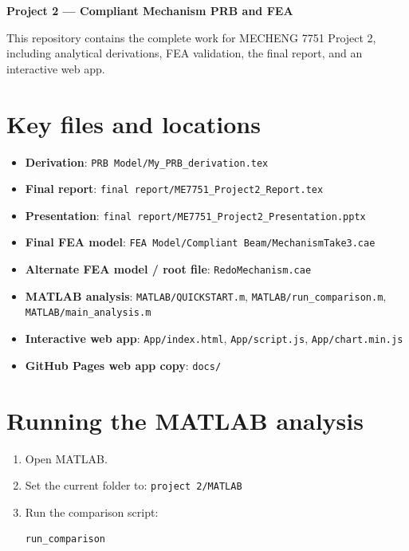 \documentclass[11pt]{article}
\begin{document}
\begin{center}
{\LARGE\bfseries Project 2 — Compliant Mechanism PRB and FEA}\\[1em]
\end{center}

This repository contains the complete work for MECHENG 7751 Project 2, including analytical derivations, FEA validation, the final report, and an interactive web app.

\section*{Key files and locations}
\begin{itemize}[leftmargin=*, itemsep=0.5em]
  \item \textbf{Derivation}: \texttt{PRB Model/My\_PRB\_derivation.tex}
  \item \textbf{Final report}: \texttt{final report/ME7751\_Project2\_Report.tex}
  \item \textbf{Presentation}: \texttt{final report/ME7751\_Project2\_Presentation.pptx}
  \item \textbf{Final FEA model}: \texttt{FEA Model/Compliant Beam/MechanismTake3.cae}
  \item \textbf{Alternate FEA model / root file}: \texttt{RedoMechanism.cae}
  \item \textbf{MATLAB analysis}: \texttt{MATLAB/QUICKSTART.m}, \texttt{MATLAB/run\_comparison.m}, \texttt{MATLAB/main\_analysis.m}
  \item \textbf{Interactive web app}: \texttt{App/index.html}, \texttt{App/script.js}, \texttt{App/chart.min.js}
  \item \textbf{GitHub Pages web app copy}: \texttt{docs/}
\end{itemize}

\section*{Running the MATLAB analysis}
\begin{enumerate}[leftmargin=*, itemsep=0.5em]
  \item Open MATLAB.
  \item Set the current folder to: \texttt{project 2/MATLAB}
  \item Run the comparison script:
    \begin{verbatim}
run_comparison
    \end{verbatim}
\end{enumerate}
\end{document}
